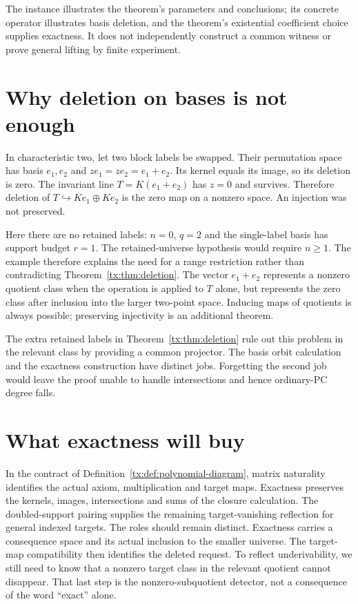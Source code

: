 \documentclass[11pt,a4paper,oneside,openany]{book}
\theoremstyle{definition}\newtheorem{definition}[theorem]{Definition}
\theoremstyle{remark}\newtheorem{remark}[theorem]{Remark}
\numberwithin{equation}{chapter}
\begin{document}
The instance illustrates the theorem's parameters and conclusions;
its concrete operator illustrates basis deletion, and the theorem's
existential coefficient choice supplies exactness. It does not
independently construct a common witness or prove general lifting
by finite experiment.

\section{Why deletion on bases is not enough}
In characteristic two, let two block labels be swapped. Their permutation
space has basis $e_1,e_2$ and $z e_1=z e_2=e_1+e_2$. Its kernel equals
its image, so its deletion is zero. The invariant line
$T=K(e_1+e_2)$ has $z=0$ and survives. Therefore deletion of
$T\hookrightarrow Ke_1\oplus Ke_2$ is the zero map on a nonzero space.
An injection was not preserved.

Here there are no retained labels: $n=0$, $q=2$ and the single-label
basis has support budget $r=1$. The retained-universe hypothesis would
require $n\ge1$. The example therefore explains the need for a
range restriction rather than contradicting Theorem~\ref{tx:thm:deletion}.
The vector $e_1+e_2$ represents a nonzero quotient class when
the operation is applied to $T$ alone, but represents the zero
class after inclusion into the larger two-point space. Inducing
maps of quotients is always possible; preserving injectivity is
an additional theorem.

The extra retained labels in Theorem~\ref{tx:thm:deletion} rule out
this problem in the relevant class by providing a common projector.
The basis orbit calculation and the exactness construction have distinct
jobs. Forgetting the second job would leave the proof unable to handle
intersections and hence ordinary-PC degree falls.

\section{What exactness will buy}
In the contract of Definition~\ref{tx:def:polynomial-diagram}, matrix
naturality identifies the actual axiom, multiplication and target maps.
Exactness preserves the kernels, images, intersections and sums of the
closure calculation. The doubled-support pairing supplies the remaining
target-vanishing reflection for general indexed targets.
The roles should remain distinct. Exactness carries a consequence
space and its actual inclusion to the smaller universe. The target-map
compatibility then identifies the deleted request. To reflect
underivability, we still need to know that a nonzero target class
in the relevant quotient cannot disappear. That last step is the
nonzero-subquotient detector, not a consequence of the word
``exact'' alone.
\end{document}
